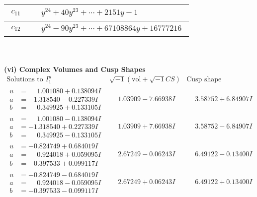 \documentclass[1p]{elsarticle_modified}
\theoremstyle{definition}
\newcommand{\I}{\sqrt{-1}}
\begin{document}
\begin{tabular}{m{50pt}|m{274pt}}
\hline $$\begin{aligned}c_{11}\end{aligned}$$&$\begin{aligned}
&y^{24}+40 y^{23}+\cdots+2151 y+1
\end{aligned}$\\
\hline $$\begin{aligned}c_{12}\end{aligned}$$&$\begin{aligned}
&y^{24}-90 y^{23}+\cdots+67108864 y+16777216
\end{aligned}$\\
\hline
\end{tabular}\\~\\
\newpage\flushleft \textbf{(vi) Complex Volumes and Cusp Shapes}
$$\begin{array}{c|c|c}  
\text{Solutions to }I^u_{1}& \I (\text{vol} + \sqrt{-1}CS) & \text{Cusp shape}\\
 \hline 
\begin{aligned}
u &= \phantom{-}1.001080 + 0.138094 I \\
a &= -1.318540 - 0.227339 I \\
b &= \phantom{-}0.349925 + 0.133105 I\end{aligned}
 & \phantom{-}1.03909 - 7.66938 I & \phantom{-}3.58752 + 6.84907 I \\ \hline\begin{aligned}
u &= \phantom{-}1.001080 - 0.138094 I \\
a &= -1.318540 + 0.227339 I \\
b &= \phantom{-}0.349925 - 0.133105 I\end{aligned}
 & \phantom{-}1.03909 + 7.66938 I & \phantom{-}3.58752 - 6.84907 I \\ \hline\begin{aligned}
u &= -0.824749 + 0.684019 I \\
a &= \phantom{-}0.924018 + 0.059095 I \\
b &= -0.397533 + 0.099117 I\end{aligned}
 & \phantom{-}2.67249 - 0.06243 I & \phantom{-}6.49122 - 0.13400 I \\ \hline\begin{aligned}
u &= -0.824749 - 0.684019 I \\
a &= \phantom{-}0.924018 - 0.059095 I \\
b &= -0.397533 - 0.099117 I\end{aligned}
 & \phantom{-}2.67249 + 0.06243 I & \phantom{-}6.49122 + 0.13400 I \\ \hline\begin{aligned}

\end{aligned}
\end{array}$$
\end{document}
